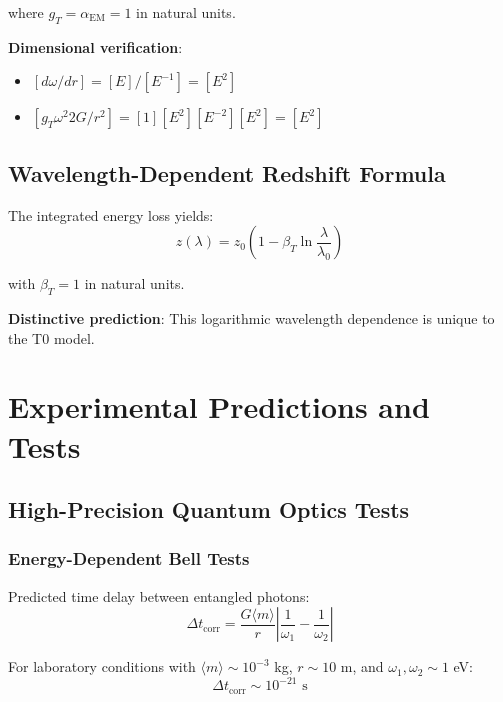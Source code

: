 \documentclass[12pt,a4paper]{article}
\begin{document}
	where $g_T = \alpha_{\text{EM}} = 1$ in natural units.
	
	\textbf{Dimensional verification}:
	\begin{itemize}
		\item $[d\omega/dr] = [E]/[E^{-1}] = [E^2]$
		\item $[g_T \omega^2 2G/r^2] = [1][E^2][E^{-2}][E^2] = [E^2]$ \checkmark
	\end{itemize}
	
	\subsection{Wavelength-Dependent Redshift Formula}
	
	The integrated energy loss yields:
	\begin{equation}
		z(\lambda) = z_0\left(1 - \beta_T \ln\frac{\lambda}{\lambda_0}\right)
		\label{eq:wavelength_dependent_redshift}
	\end{equation}
	
	with $\beta_T = 1$ in natural units.
	
	\textbf{Distinctive prediction}: This logarithmic wavelength dependence is unique to the T0 model.
	
	\section{Experimental Predictions and Tests}
	
	\subsection{High-Precision Quantum Optics Tests}
	
	\subsubsection{Energy-Dependent Bell Tests}
	
	Predicted time delay between entangled photons:
	\begin{equation}
		\Delta t_{\text{corr}} = \frac{G\langle m \rangle}{r} \left|\frac{1}{\omega_1} - \frac{1}{\omega_2}\right|
		\label{eq:correlation_time_delay}
	\end{equation}
	
	For laboratory conditions with $\langle m \rangle \sim 10^{-3}$ kg, $r \sim 10$ m, and $\omega_1,\omega_2 \sim 1$ eV:
	\begin{equation}
		\Delta t_{\text{corr}} \sim 10^{-21} \text{ s}
		\label{eq:laboratory_delay}
	\end{equation}
	
\end{document}
